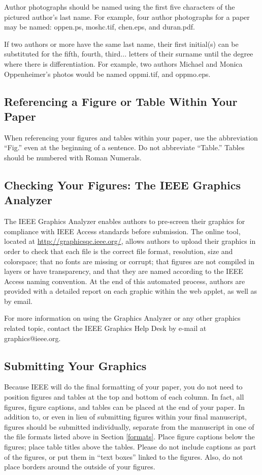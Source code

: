 \documentclass{ieeeaccess}
\begin{document}
Author photographs should be named using the first five characters of the 
pictured author's last name. For example, four author photographs for a 
paper may be named: oppen.ps, moshc.tif, chen.eps, and duran.pdf.

If two authors or more have the same last name, their first initial(s) can 
be substituted for the fifth, fourth, third$\ldots$ letters of their surname 
until the degree where there is differentiation. For example, two authors 
Michael and Monica Oppenheimer's photos would be named oppmi.tif, and 
oppmo.eps.

\subsection{Referencing a Figure or Table Within Your Paper}
When referencing your figures and tables within your paper, use the 
abbreviation ``Fig.'' even at the beginning of a sentence. Do not abbreviate 
``Table.'' Tables should be numbered with Roman Numerals.

\subsection{Checking Your Figures: The IEEE Graphics Analyzer}
The IEEE Graphics Analyzer enables authors to pre-screen their graphics for 
compliance with IEEE Access standards before submission. 
The online tool, located at
\underline{http://graphicsqc.ieee.org/}, allows authors to 
upload their graphics in order to check that each file is the correct file 
format, resolution, size and colorspace; that no fonts are missing or 
corrupt; that figures are not compiled in layers or have transparency, and 
that they are named according to the IEEE Access naming 
convention. At the end of this automated process, authors are provided with 
a detailed report on each graphic within the web applet, as well as by 
email.

For more information on using the Graphics Analyzer or any other graphics 
related topic, contact the IEEE Graphics Help Desk by e-mail at 
graphics@ieee.org.

\subsection{Submitting Your Graphics}
Because IEEE will do the final formatting of your paper,
you do not need to position figures and tables at the top and bottom of each 
column. In fact, all figures, figure captions, and tables can be placed at 
the end of your paper. In addition to, or even in lieu of submitting figures 
within your final manuscript, figures should be submitted individually, 
separate from the manuscript in one of the file formats listed above in 
Section \ref{formats}. Place figure captions below the figures; place table titles 
above the tables. Please do not include captions as part of the figures, or 
put them in ``text boxes'' linked to the figures. Also, do not place borders 
around the outside of your figures.
\end{document}
